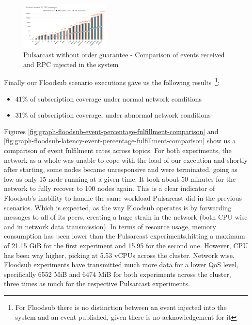 \begin{figure}[!htb]
  \centering
  \includegraphics[width=0.4\textwidth]{../images/graph-pulsarcast-rpc.png}
  \caption{Pulsarcast without order guarantee - Comparison of events received and RPC injected in the system}
  \label{fig:graph-pulsarcast-rpc}
\end{figure}

Finally our Floodsub scenario executions gave us the following
results~\footnote{For Floodsub there is no distinction between an event
injected into the system and an event published, given there is no
acknowledgement for it}:

\begin{itemize}
  \item 41\% of subscription coverage under normal network conditions
  \item 31\% of subscription coverage, under abnormal network conditions
\end{itemize}

Figures \ref{fig:graph-floodsub-event-percentage-fulfillment-comparison} and
\ref{fig:graph-floodsub-latency-event-percentage-fulfillment-comparison} show
us a comparison of event fulfilment rates across topics. For both experiments,
the network as a whole was unable to cope with the load of our execution and
shortly after starting, some nodes became unresponsive and were terminated,
going as low as only 15 node running at a given time. It took about 50 minutes
for the network to fully recover to 100 nodes again. This is a clear indicator
of Floodsub's inability to handle the same workload Pulsarcast did in the
previous scenarios. Which is expected, as the way Floodsub operates is by
forwarding messages to all of its peers, creating a huge strain in the network
(both CPU wise and in network data transmission). In terms of resource usage,
memory consumption has been lower than the Pulsarcast experiments,hitting a
maximum of 21.15 GiB for the first experiment and 15.95 for the second one.
However, CPU has been way higher, picking at 5.53 vCPUs across the cluster.
Network wise, Floodsub experiments have transmitted much more data for a lower
QoS level, specifically 6552 MiB and 6474 MiB for both experiments across the
cluster, three times as much for the respective Pulsarcast experiments.

